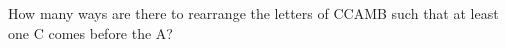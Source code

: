 How many ways are there to rearrange the letters of CCAMB such that at least one C comes before the A?